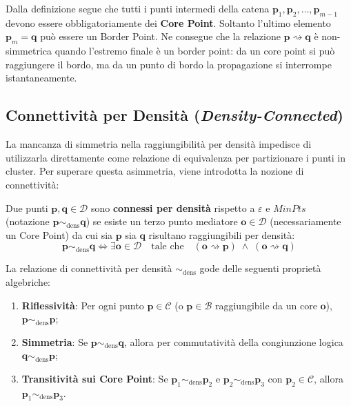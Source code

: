 \begin{remark}
Dalla definizione segue che tutti i punti intermedi della catena $\mathbf{p}_1, \mathbf{p}_2, \dots, \mathbf{p}_{m-1}$ devono essere obbligatoriamente dei \textbf{Core Point}. Soltanto l'ultimo elemento $\mathbf{p}_m = \mathbf{q}$ può essere un Border Point. Ne consegue che la relazione $\mathbf{p} \rightsquigarrow \mathbf{q}$ è non-simmetrica quando l'estremo finale è un border point: da un core point si può raggiungere il bordo, ma da un punto di bordo la propagazione si interrompe istantaneamente.
\end{remark}

\FloatBarrier
\subsection{Connettività per Densità (\textit{Density-Connected})}

La mancanza di simmetria nella raggiungibilità per densità impedisce di utilizzarla direttamente come relazione di equivalenza per partizionare i punti in cluster. Per superare questa asimmetria, viene introdotta la nozione di connettività:

\begin{definition}
Due punti $\mathbf{p}, \mathbf{q} \in \mathcal{D}$ sono \textbf{connessi per densità} rispetto a $\varepsilon$ e $MinPts$ (notazione $\mathbf{p} \sim_{\mathrm{dens}} \mathbf{q}$) se esiste un terzo punto mediatore $\mathbf{o} \in \mathcal{D}$ (necessariamente un Core Point) da cui sia $\mathbf{p}$ sia $\mathbf{q}$ risultano raggiungibili per densità:
\begin{equation}
    \mathbf{p} \sim_{\mathrm{dens}} \mathbf{q} \iff \exists \mathbf{o} \in \mathcal{D} \quad \text{tale che} \quad (\mathbf{o} \rightsquigarrow \mathbf{p}) \;\land\; (\mathbf{o} \rightsquigarrow \mathbf{q})
    \label{eq:dm-density-connected}
\end{equation}
\end{definition}

\begin{property}
La relazione di connettività per densità $\sim_{\mathrm{dens}}$ gode delle seguenti proprietà algebriche:
\begin{enumerate}
    \item \textbf{Riflessività}: Per ogni punto $\mathbf{p} \in \mathcal{C}$ (o $\mathbf{p} \in \mathcal{B}$ raggiungibile da un core $\mathbf{o}$), $\mathbf{p} \sim_{\mathrm{dens}} \mathbf{p}$;
    \item \textbf{Simmetria}: Se $\mathbf{p} \sim_{\mathrm{dens}} \mathbf{q}$, allora per commutatività della congiunzione logica $\mathbf{q} \sim_{\mathrm{dens}} \mathbf{p}$;
    \item \textbf{Transitività sui Core Point}: Se $\mathbf{p}_1 \sim_{\mathrm{dens}} \mathbf{p}_2$ e $\mathbf{p}_2 \sim_{\mathrm{dens}} \mathbf{p}_3$ con $\mathbf{p}_2 \in \mathcal{C}$, allora $\mathbf{p}_1 \sim_{\mathrm{dens}} \mathbf{p}_3$.
\end{enumerate}
\end{property}

